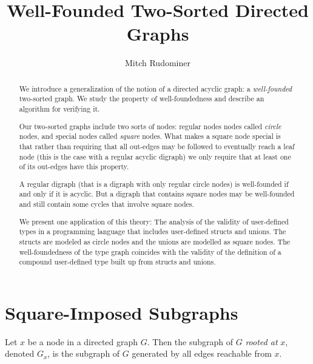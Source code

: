 \documentclass[oneside,12pt]{amsart}
\begin{document}
\title{Well-Founded Two-Sorted Directed Graphs}
\author{Mitch Rudominer}
\address{Google}


\begin{abstract}
We introduce a generalization of the notion of a directed acyclic  graph:
a \emph{well-founded} two-sorted graph. We study the
property of well-foundedness and describe an algorithm for verifying it.

Our two-sorted graphs include two sorts of nodes: regular nodes
nodes called \emph{circle} nodes, and special nodes called \emph{square} nodes.
What makes a square node special is that rather than requiring that all
out-edges may be followed to eventually reach a leaf node (this is the
case with a regular acyclic digraph) we only require that at least one
of its out-edges have this property.

A regular digraph (that is a digraph with only regular circle nodes) is
well-founded if and only if it is acyclic. But a digraph that contains square
nodes may be well-founded and still contain some cycles that involve square
nodes.

We present one application of this theory: The analysis of the validity of
user-defined types in a programming language that includes user-defined structs and unions.
The structs are modeled as circle nodes and the unions are modelled as square
nodes. The well-foundedness of the type graph coincides with the validity
of the definition of a compound user-defined type built up from structs and unions.
\end{abstract}

\maketitle

\tableofcontents


\section{Square-Imposed Subgraphs}

\begin{definition}
Let $x$ be a node in a directed graph $G$. Then the subgraph of $G$ \emph{rooted at} $x$,
denoted $G_x$, is the subgraph of $G$ generated by all edges reachable from $x$.
\end{definition}
\end{document}
